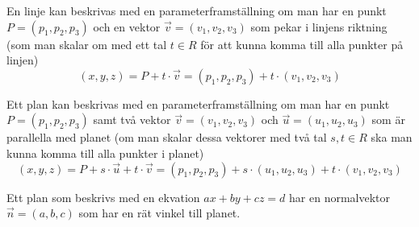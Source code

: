 \documentclass[../main.tex]{subfiles}
\begin{document}
\begin{formel}
\label{parameterlinje} 
En linje kan beskrivas med en parameterframställning om man har en punkt $P = (p_1, p_2, p_3)$ och en vektor $\vec{v}=(v_1, v_2, v_3)$ som pekar i linjens riktning (som man skalar om med ett tal $t \in R$ för att kunna komma till alla punkter på linjen)
\[(x, y, z) = P + t \cdot \vec{v} = (p_1, p_2, p_3) + t\cdot (v_1, v_2, v_3)\]
\end{formel}


\begin{formel}
\label{parameterplan} 
Ett plan kan beskrivas med en parameterframställning om man har en punkt $P = (p_1, p_2, p_3)$ samt två vektor $\vec{v}=(v_1, v_2, v_3)$ och $\vec{u}=(u_1, u_2, u_3)$ som är parallella med planet (om man skalar dessa vektorer med två tal $s, t \in R$ ska man kunna komma till alla punkter i planet)
\[(x, y, z) = P + s \cdot \vec{u} + t \cdot \vec{v} = (p_1, p_2, p_3) + s\cdot (u_1, u_2, u_3) + t \cdot (v_1, v_2, v_3)\]
\end{formel}


\begin{formel}
\label{normalplan} 
Ett plan som beskrivs med en ekvation $ax + by + cz = d$ har en normalvektor $\vec{n} = (a, b, c)$ som har en rät vinkel till planet.
\end{formel}
\end{document}

